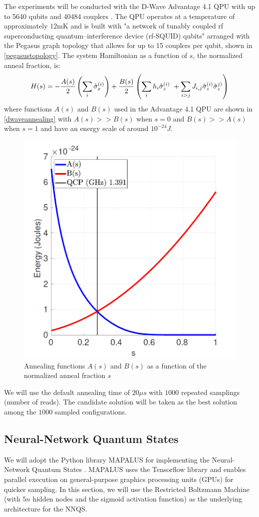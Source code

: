 The experiments will be conducted with the D-Wave Advantage 4.1 QPU with up to 5640 qubits and 40484 couplers \cite{dwaveadvantage}. The QPU operates at a temperature of approximately $12$mK and is built with "a network of tunably coupled rf superconducting quantum–interference device (rf-SQUID) qubits" arranged with the Pegasus graph topology that allows for up to 15 couplers per qubit, shown in \autoref{pegasustopology}. The system Hamiltonian as a function of $s$, the normalized anneal fraction, is:
\begin{equation}
    \label{eqn:dwavehamiltonian}
    H(s) = -\frac{A(s)}{2}\left(\sum_{i} \Hat{\sigma}_x^{(i)}\right) + \frac{B(s)}{2}\left(\sum_{i}h_i \Hat{\sigma}_z^{(i)}\ + \sum_{i > j}J_{i,j} \Hat{\sigma}_z^{(i)}\Hat{\sigma}_z^{j)}\right)
\end{equation}
where functions $A(s)$ and $B(s)$ used in the Advantage 4.1 QPU are shown in \autoref{dwaveannealing} with $A(s) >> B(s)$ when $s=0$ and $B(s) >> A(s)$ when $s=1$ and have an energy scale of around $10^{-24} J$.
\begin{figure}[h!]
    \centering
    \includegraphics[width=0.6\linewidth]{images/dwave_annealing.png}
    \caption[Annealing functions $A(s)$ and $B(s)$ as a function of the normalized anneal fraction $s$]{Annealing functions $A(s)$ and $B(s)$ as a function of the normalized anneal fraction $s$~\protect\cite{dwaveadvantage}}
    \label{dwaveannealing}
\end{figure}
We will use the default annealing time of $20\mu s$ with $1000$ repeated samplings (number of reads). The candidate solution will be taken as the best solution among the $1000$ sampled configurations.


\subsection{Neural-Network Quantum States}
We will adopt the Python library MAPALUS for implementing the Neural-Network Quantum States \cite{b25}. MAPALUS uses the Tensorflow library and enables parallel execution on general-purpose graphics processing units (GPUs) for quicker sampling. In this section, we will use the Restricted Boltzmann Machine (with $5n$ hidden nodes and the sigmoid activation function) as the underlying architecture for the NNQS. 

